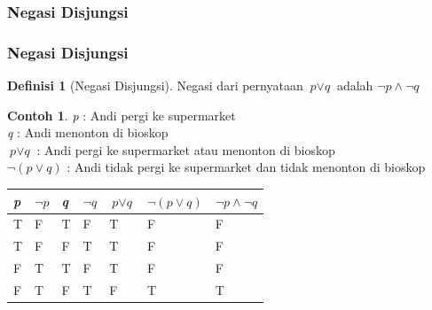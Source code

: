 \documentclass[handout]{beamer}
\theoremstyle{definition}
\newtheorem{definisi}[theorem]{Definisi}
\theoremstyle{example}
\newtheorem{contoh}[theorem]{Contoh}
\begin{document}
\subsubsection{Negasi Disjungsi}
\begin{frame}
	\frametitle{Negasi Disjungsi}
    \begin{definisi}[Negasi Disjungsi]
    	Negasi dari pernyataan $\textit{p}\vee\textit{q}$  adalah $\neg\textit{p}\wedge\neg\textit{q}$    		 	
    \end{definisi}
    \begin{contoh}
    	\textit{p} : Andi pergi ke supermarket \\
    	\textit{q} : Andi menonton di bioskop \\
    	$\textit{p}\vee\textit{q}$ : Andi pergi ke supermarket atau menonton di bioskop\\
    	$\neg(\textit{p}\vee\textit{q})$ : Andi tidak pergi ke supermarket dan tidak menonton di bioskop	\\
    	
    	\begin{tabular}{ | l | l | l | l | l | l | l |}
    		\hline
    		\textit{p} & $\neg\textit{p}$ & \textit{q} & $\neg\textit{q}$ & $\textit{p}\vee\textit{q}$ & $\neg(\textit{p}\vee\textit{q})$ & $\neg\textit{p}\wedge\neg\textit{q}$ \\ \hline
    		T & F & T & F & T & F & F\\ \hline
    		T & F & F & T & T & F & F \\ \hline
    		F & T & T & F & T & F & F\\ \hline
    		F & T & F & T & F & T & T\\     		 
    		\hline
    	\end{tabular}
    \end{contoh}
\end{frame}
\end{document}
